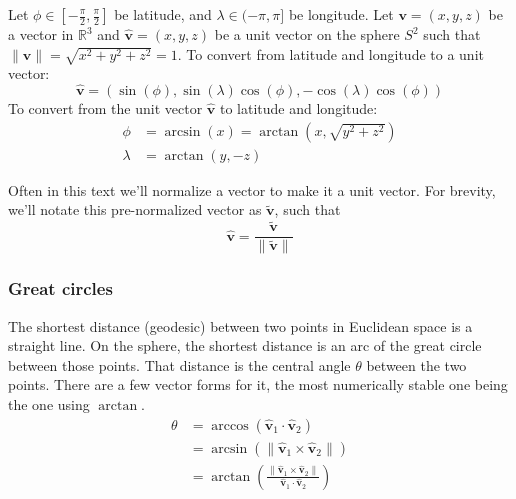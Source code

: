 \documentclass{amsart}[12pt]
\begin{document}
Let $\phi \in [-\frac{\pi}{2}, \frac{\pi}{2}]$ be latitude, and
$\lambda \in (-\pi, \pi]$ be longitude. Let $\mathbf v = (x, y, z)$ be a vector
in $\mathbb R^3$ and $\mathbf{\hat{v}} = (x, y, z)$ be a unit vector on the
sphere $S^2$ such that $\| \mathbf{\hat{v}} \| = \sqrt{x^2 + y^2 +z^2} = 1$.
To convert from latitude and longitude to a unit vector:
\begin{equation}
  \mathbf{\hat{v}} = \left(\sin (\phi), \sin (\lambda) \cos (\phi),
  -\cos (\lambda) \cos (\phi) \right)
\end{equation}
To convert from the unit vector $\mathbf{\hat{v}}$ to latitude and longitude:
\begin{equation}\begin{split}
  \phi &= \arcsin (x) = \arctan (x, \sqrt{y^2 + z^2}) \\
  \lambda &= \arctan (y, -z)
\end{split}\end{equation}

Often in this text we'll normalize a vector to make it a unit vector.
For brevity,
we'll notate this pre-normalized vector as $\mathbf{\widetilde{v}}$, such that
\begin{equation}
  \mathbf{\hat{v}} = \frac{\mathbf{\widetilde{v}}}{\|\mathbf{\widetilde{v}}\|}
\end{equation}

\subsubsection{Great circles}
The shortest distance (geodesic) between two points in Euclidean space is a
straight line. On the sphere, the shortest distance is an arc of the great
circle between those points. That distance is the central angle $\theta$
between the two points. There are a few vector forms for it, the most
numerically stable one being the one using $\arctan$.
\begin{equation}\begin{split}
\theta &= \arccos \left(\mathbf{\hat{v}}_1 \cdot \mathbf{\hat{v}}_2\right) \\
&= \arcsin \left(\|\mathbf{\hat{v}}_1 \times \mathbf{\hat{v}}_2\| \right) \\
&= \arctan \left( \frac{\|\mathbf{\hat{v}}_1 \times \mathbf{\hat{v}}_2\|}
  {\mathbf{\hat{v}}_1 \cdot \mathbf{\hat{v}}_2} \right)
\end{split}\end{equation}
\end{document}

